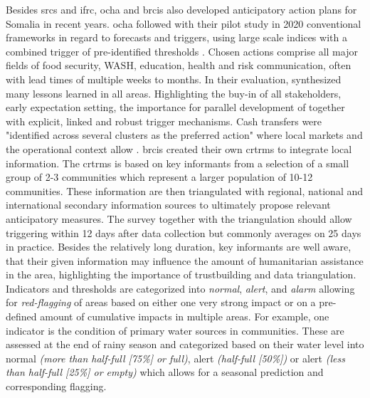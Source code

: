 Besides \acrshort*{srcs} and \acrshort*{ifrc}, \acrshort*{ocha} and \acrshort*{brcis} also developed anticipatory action plans for Somalia in recent years. \acrshort*{ocha} followed with their pilot study in 2020 conventional frameworks in regard to forecasts and triggers, using large scale indices with a combined trigger of pre-identified thresholds \autocite{gettliffeOCHAAnticipatoryAction2021,ochaANTICIPATORYACTIONPLAN2020}. Chosen actions comprise all major fields of food security, WASH, education, health and risk communication, often with lead times of multiple weeks to months. In their evaluation, \autocite{gettliffeOCHAAnticipatoryAction2021} synthesized many lessons learned in all areas. Highlighting the buy-in of all stakeholders, early expectation setting, the importance for parallel development of  together with explicit, linked and robust trigger mechanisms. Cash transfers were "identified across several clusters as the preferred action" where local markets and the operational context allow \autocites[21]{gettliffeOCHAAnticipatoryAction2021}{ochaANTICIPATORYACTIONPLAN2020}.
\acrshort*{brcis} created their own \acrfull{crtrms} to integrate local information. The \acrshort*{crtrms} is based on key informants from a selection of a small group of 2-3 communities which represent a larger population of 10-12 communities. These information are then triangulated with regional, national and international secondary information sources to ultimately propose relevant anticipatory measures. The survey together with the triangulation should allow triggering within 12 days after data collection but commonly averages on 25 days in practice. Besides the relatively long duration, key informants are well aware, that their given information may influence the amount of humanitarian assistance in the area, highlighting the importance of trustbuilding and data triangulation\autocite{gualazziniEWEAEarlyWarning2021}. Indicators and thresholds are categorized into \textit{normal}, \textit{alert}, and \textit{alarm} allowing for \textit{red-flagging} of areas based on either one very strong impact or on a pre-defined amount of cumulative impacts in multiple areas. For example, one indicator is the condition of primary water sources in communities. These are assessed at the end of rainy season and categorized based on their water level into normal \textit{(more than half-full [75\%] or full)}, alert \textit{(half-full [50\%])} or alert \textit{(less than half-full [25\%] or empty)} which allows for a seasonal prediction and corresponding  flagging.

